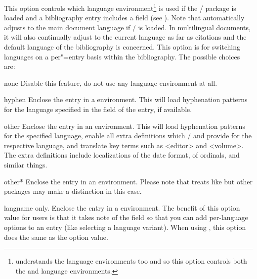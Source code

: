 \documentclass{ltxdockit}[2011/03/25]
\begin{document}
\begin{optionlist}
This option controls which  language environment\footnote{ understands the  language environments too and so this option controls both the  and  language environments.} is used if the / package is loaded and a bibliography entry includes a  field (see ). Note that  automatically adjusts to the main document language if / is loaded. In multilingual documents, it will also continually adjust to the current language as far as citations and the default language of the bibliography is concerned. This option is for switching languages on a per"=entry basis within the bibliography. The possible choices are:

\begin{valuelist}

\item[none]
Disable this feature, \ie do not use any language environment at all.

\item[hyphen]
Enclose the entry in a  environment. This will load hyphenation patterns for the language specified in the  field of the entry, if available.

\item[other]
Enclose the entry in an  environment. This will load hyphenation patterns for the specified language, enable all extra definitions which / and  provide for the respective language, and translate key terms such as <editor> and <volume>. The extra definitions include localizations of the date format, of ordinals, and similar things.

\item[other*]
Enclose the entry in an  environment. Please note that  treats  like  but other packages may make a distinction in this case.

\item[langname]
 only. Enclose the entry in a  environment. The benefit of this option value for  users is that it takes note of the  field so that you can add per-language options to an entry (like selecting a language variant). When using , this option does the same as the  option value.


\end{valuelist}
\end{optionlist}
\end{document}
